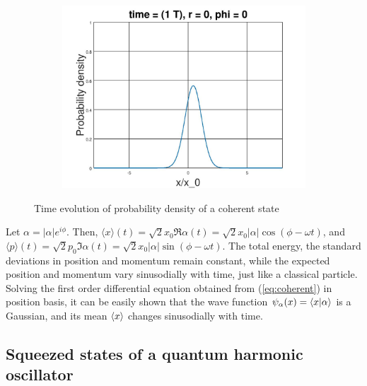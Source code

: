 \documentclass[12pt, twoside]{article}
\begin{document}
\begin{figure}[h!]
\begin{subfigure}[h!]{0.3\linewidth}
	\includegraphics[width=\linewidth]{graphs/coherent/8.jpg}
\end{subfigure}
	\caption{Time evolution of probability density of a coherent state}
\end{figure}
Let $\alpha = |\alpha|e^{i\phi}$. Then, $\langle x \rangle (t) $$= \sqrt{2} x_0 \Re{\alpha(t)} $$= \sqrt{2} x_0 |\alpha| \cos(\phi-\omega t)$, and $ \langle p \rangle (t) $$= \sqrt{2} p_0 \Im{\alpha(t)} $$= \sqrt{2} x_0 |\alpha| \sin(\phi-\omega t)$. The total energy, the standard deviations in position and momentum remain constant, while the expected position and momentum vary sinusodially with time, just like a classical particle. Solving the first order differential equation obtained from (\ref{eq:coherent}) in position basis, it can be easily shown that the wave function $\psi_\alpha (x) = \braket{x}{\alpha}$ is a Gaussian, and its mean $\expval{x}$ changes sinusodially with time.
\subsection{Squeezed states of a quantum harmonic oscillator}
\end{document}
